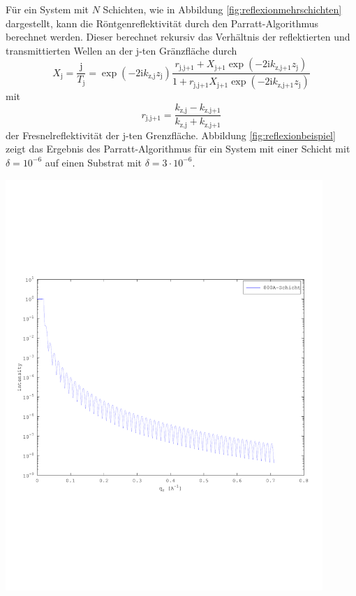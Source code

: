\documentclass[captions=tableheading]{scrartcl}
\newcommand{\im}{\mathrm{i}}
\newcommand{\indx}[1]{\text{#1}}
\begin{document}
Für ein System mit $N$ Schichten, wie in Abbildung \ref{fig:reflexionmehrschichten} dargestellt, kann die Röntgenreflektivität durch den Parratt-Algorithmus berechnet werden. 
Dieser berechnet rekursiv das Verhältnis der reflektierten und transmittierten Wellen an der j-ten Gränzfläche durch
\begin{equation}
X_\indx{j}=\frac{\indx{j}}{T_\indx{j}}=\exp \left(-2\im k_\indx{z,j}z_\indx{j} \right)\frac{r_\indx{j,j+1} + X_\indx{j+1}\exp\left(-2\im k_\indx{z,j+1}z_\indx{j}\right) }{ 1+r_\indx{j,j+1}X_\indx{j+1}\exp\left(-2\im k_\indx{z,j+1}z_\indx{j}\right) }
\end{equation}
mit
\begin{equation}
r_\indx{j,j+1}= \frac{k_\indx{z,j}-k_\indx{z,j+1}}{k_\indx{z,j}+k_\indx{z,j+1}}
\end{equation}
der Fresnelreflektivität der j-ten Grenzfläche. 
Abbildung \ref{fig:reflexionbeispiel} zeigt das Ergebnis des Parratt-Algorithmus für ein System mit einer Schicht mit $\delta=10^{-6}$ auf einen  Substrat mit $\delta = 3\cdot 10^{-6}$.
\begin{center}
	\includegraphics[width=0.9\textwidth]{images/reflektivitaet_schicht.pdf}
	\label{fig:reflexionbeispiel}
\end{center}
\end{document}
